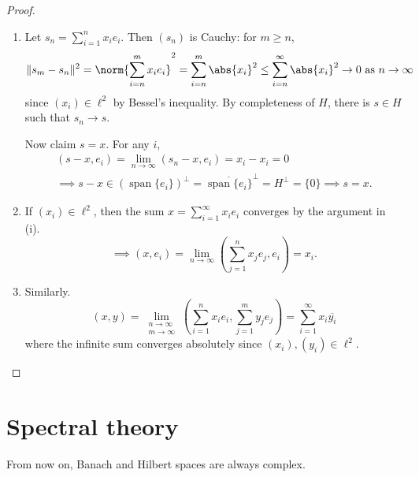 \documentclass{article}
\DeclareMathOperator{\spn}{span}
\begin{document}
\begin{proof}
    \leavevmode
    \begin{enumerate}[label=(\roman*)]
        \item Let $s_n = \sum_{i=1}^n x_i e_i$. Then $(s_n)$ is Cauchy: for $m \geq n$,
            \begin{equation*}
                \|s_m - s_n\|^2 = \norm{\sum_{i=n}^m x_i e_i}^2 = \sum_{i=n}^m \abs{x_i}^2 \leq \sum_{i=n}^\infty \abs{x_i}^2 \to 0 \text{ as } n \to \infty
            \end{equation*}
            since $(x_i) \in \ell^2$ by Bessel's inequality. By completeness of $H$, there is $s \in H$ such that $s_n \to s$.

            Now claim $s = x$.
            For any $i$,
            \begin{gather*}
                (s-x, e_i) = \lim_{n \to \infty} (s_n - x, e_i) = x_i - x_i = 0 \\
                \implies s-x \in (\spn \{e_i\})^\bot = \overline{\spn \{e_i\}}^\bot = H^\bot = \{0\} \implies s = x.
            \end{gather*}
        \item If $(x_i) \in \ell^2$, then the sum $x = \sum_{i=1}^\infty x_i e_i$ converges by the argument in (i).
            \begin{equation*}
                \implies (x, e_i) = \lim_{n \to \infty} \left(\sum_{j=1}^n x_j e_j, e_i\right) = x_i.
            \end{equation*}
        \item Similarly.
            \begin{equation*}
            (x, y) = \lim_{\substack{n \to \infty \\ m \to \infty}} \left(\sum_{i=1}^n x_i e_i, \sum_{j=1}^m y_j e_j\right) = \sum_{i=1}^\infty x_i \overline{y_i}
            \end{equation*}
            where the infinite sum converges absolutely since $(x_i), (y_i) \in \ell^2$. \qedhere
    \end{enumerate}
\end{proof}

\clearpage
\section{Spectral theory}
From now on, Banach and Hilbert spaces are always complex.
\end{document}
